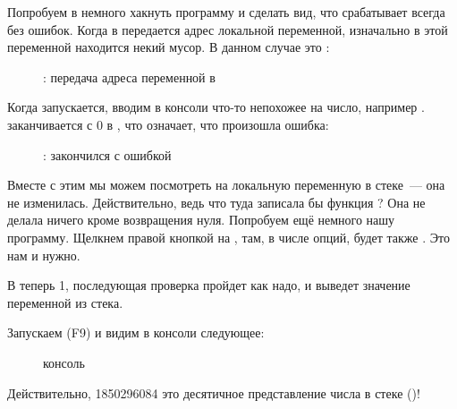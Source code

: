 \clearpage
{}

Попробуем в \olly немного хакнуть программу и сделать вид, что \scanf срабатывает всегда без ошибок.
Когда в \scanf передается адрес локальной переменной, изначально в этой переменной
находится некий мусор. В данном случае это :

\begin{figure}[H]
\centering
{}
\caption{\olly: передача адреса переменной в \scanf}
\label{fig:scanf_ex3_olly_1}
\end{figure}

\clearpage
Когда \scanf запускается, вводим в консоли что-то непохожее на число, например .
\scanf заканчивается с 0 в \EAX, что означает, что произошла ошибка:

\begin{figure}[H]
\centering
{}
\caption{\olly: \scanf закончился с ошибкой}
\label{fig:scanf_ex3_olly_2}
\end{figure}

Вместе с этим мы можем посмотреть на локальную переменную в стеке~--- она не изменилась.
Действительно, ведь что туда записала бы функция \scanf?
Она не делала ничего кроме возвращения нуля.
Попробуем ещё немного  нашу программу.
Щелкнем правой кнопкой на \EAX, там, в числе опций, будет также .
Это нам и нужно.

В \EAX теперь 1, последующая проверка пройдет как надо, и \printf выведет значение переменной из стека.

Запускаем (F9) и видим в консоли следующее:

\begin{figure}[H]
\centering
{}
\caption{консоль}
\end{figure}

Действительно, 1850296084 это десятичное представление числа в стеке ()!
